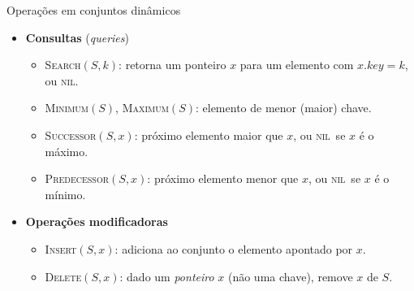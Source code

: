 \documentclass[aspectratio=169,10pt]{beamer}
\newcommand{\NIL}{\textnormal{\rmfamily\textsc{nil}}}
\newcommand{\proc}[1]{\textnormal{\rmfamily\textsc{#1}}}
\newcommand{\at}[1]{.\mathit{#1}}
\begin{document}
\begin{frame}{Operações em conjuntos dinâmicos}
  \begin{itemize}
    \item \textbf{Consultas} (\emph{queries})
      \begin{itemize}
        \item \proc{Search}$(S,k)$: retorna um ponteiro $x$ para um elemento com
              $x\at{key}=k$, ou \NIL.
        \item \proc{Minimum}$(S)$, \proc{Maximum}$(S)$: elemento de menor (maior) chave.
        \item \proc{Successor}$(S,x)$: próximo elemento maior que $x$, ou \NIL\ se $x$ é o máximo.
        \item \proc{Predecessor}$(S,x)$: próximo elemento menor que $x$, ou \NIL\ se $x$ é o mínimo.
      \end{itemize}
    \item \textbf{Operações modificadoras}
      \begin{itemize}
        \item \proc{Insert}$(S,x)$: adiciona ao conjunto o elemento apontado por $x$.
        \item \proc{Delete}$(S,x)$: dado um \emph{ponteiro} $x$ (não uma chave),
              remove $x$ de $S$.
      \end{itemize}
  \end{itemize}
\end{frame}

\end{document}
